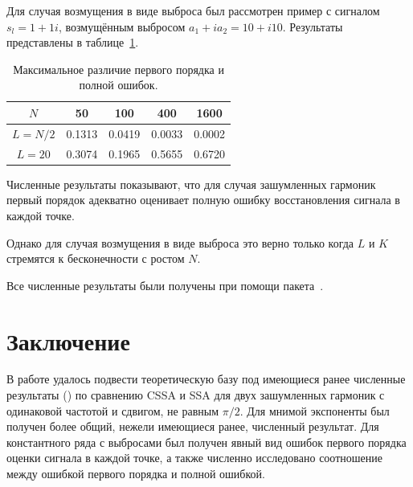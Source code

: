 \documentclass{spisok-article}
\begin{document}
Для случая возмущения в виде выброса был рассмотрен пример с сигналом $s_l = 1 + 1i$, возмущённым выбросом $a_1 + ia_2 = 10 + i10$. Результаты представлены в таблице~\ref{tab:const_outl}.

\begin{table}[H]
	\begin{center}
		\caption{Максимальное различие первого порядка и полной ошибок.}
		\label{tab:const_outl}
		\begin{tabular}{|c|c|c|c|c|}
			\hline
			$N$	& 50 & 100 & 400 & 1600 \\ 
			\hline
			$L = N / 2$ & 0.1313  & 0.0419  & 0.0033 & 0.0002 \\
			\hline
			$L = 20$ & 0.3074  & 0.1965  & 0.5655 & 0.6720 \\
			\hline
		\end{tabular}
	\end{center}
\end{table}

Численные результаты показывают, что для случая зашумленных гармоник первый порядок адекватно оценивает полную ошибку восстановления сигнала в каждой точке.

Однако для случая возмущения в виде выброса это верно только когда $L$ и $K$ стремятся к бесконечности с ростом $N$.

Все численные результаты были получены при помощи пакета~\cite{Korobeynikov.etal2014}.


\section{Заключение}
\label{sec:conclusions}
В работе удалось подвести теоретическую базу под имеющиеся ранее численные результаты (\cite{Golyandina.etal2013}) по сравнению CSSA и SSA для двух зашумленных гармоник с одинаковой частотой и сдвигом, не равным $\pi/2$. Для мнимой экспоненты был получен более общий, нежели имеющиеся ранее, численный результат.  
Для константного ряда с выбросами был получен явный вид ошибок первого порядка оценки сигнала в каждой точке, а также численно исследовано соотношение между ошибкой первого порядка и полной ошибкой.
\end{document}
